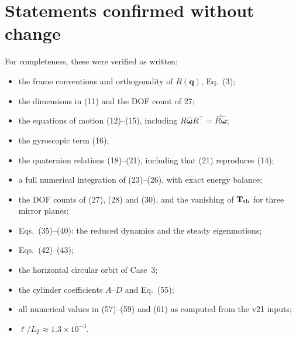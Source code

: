 \documentclass[11pt]{article}
\newcommand{\vect}[1]{\bm{#1}}
\newcommand{\T}{^{\!\top}}
\begin{document}
\section*{Statements confirmed without change}
For completeness, these were verified as written:
\begin{itemize}
  \item the frame conventions and orthogonality of $R(\vect q)$, Eq.~(3);
  \item the dimensions in (11) and the DOF count of 27;
  \item the equations of motion (12)--(15), including $R\widehat{\vect\omega}R\T=\widehat{R\vect\omega}$;
  \item the gyroscopic term (16);
  \item the quaternion relations (18)--(21), including that (21) reproduces (14);
  \item a full numerical integration of (23)--(26), with exact energy balance;
  \item the DOF counts of (27), (28) and (30), and the vanishing of $\mathbf T_{\rm th}$ for three mirror planes;
  \item Eqs.~(35)--(40): the reduced dynamics and the steady eigenmotions;
  \item Eqs.~(42)--(43);
  \item the horizontal circular orbit of Case~3;
  \item the cylinder coefficients $A$--$D$ and Eq.~(55);
  \item all numerical values in (57)--(59) and (61) as computed from the v21 inputs;
  \item $\ell/L_T\approx1.3\times10^{-3}$.
\end{itemize}
\end{document}
